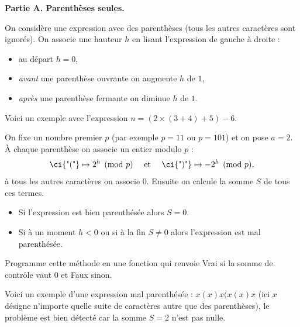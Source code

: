 \documentclass[11pt,class=report,crop=false]{standalone}
\begin{document}
\begin{activite}
	


\textbf{Partie A. Parenthèses seules.}

On considère une expression avec des parenthèses (tous les autres caractères sont ignorés). 
On associe une hauteur $h$ en lisant l'expression de gauche à droite :
\begin{itemize}
	\item au départ $h=0$,
	\item \emph{avant} une parenthèse ouvrante  on augmente $h$ de $1$,
	\item \emph{après} une parenthèse fermante  on diminue $h$ de $1$.
\end{itemize}

Voici un exemple avec l'expression \og{}$n=(2\times(3+4)+5)-6$\fg{}.


On fixe un nombre premier $p$ (par exemple $p=11$ ou $p=101$) et on pose $a=2$.
\`A chaque parenthèse on associe un entier modulo $p$ :
$$ \text{\ci{"("}} \mapsto 2^h \pmod{p} \quad \text{ et }\quad \text{\ci{")"}} \mapsto -2^h \pmod{p},$$
à tous les autres caractères on associe $0$. Ensuite on calcule la somme $S$ de tous ces termes.


\begin{itemize}
 \item Si l'expression est bien parenthésée alors $S=0$.
 \item Si à un moment $h<0$ ou si à la fin $S \neq 0$ alors l'expression est mal parenthésée.
\end{itemize}

\bigskip

Programme cette méthode en une fonction  qui renvoie
\og{}Vrai\fg{} si la somme de contrôle vaut $0$ et \og{}Faux\fg{} sinon.


Voici un exemple d'une expression mal parenthésée : \og{}$x(x)x(x(x)x$\fg{} (ici $x$ désigne n'importe quelle suite de caractères autre que des parenthèses), le problème est bien détecté car la somme $S=2$ n'est pas nulle.


\bigskip


\end{activite}
\end{document}
